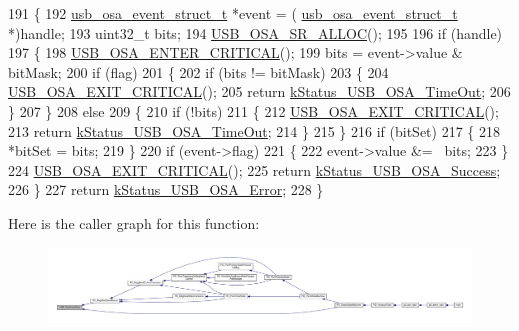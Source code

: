 \begin{DoxyCode}
191 \{
192     \hyperlink{struct__usb__osa__event__struct}{usb\_osa\_event\_struct\_t} *\textcolor{keyword}{event} = (
      \hyperlink{struct__usb__osa__event__struct}{usb\_osa\_event\_struct\_t} *)handle;
193     uint32\_t bits;
194     \hyperlink{usb__osa__bm_8h_a8dbccf46cc2f8e3b5cece6a4a84f7ae8}{USB\_OSA\_SR\_ALLOC}();
195 
196     \textcolor{keywordflow}{if} (handle)
197     \{
198         \hyperlink{usb__osa__bm_8h_a0485f70bf9c9a22f0340f014bc567362}{USB\_OSA\_ENTER\_CRITICAL}();
199         bits = \textcolor{keyword}{event}->value & bitMask;
200         \textcolor{keywordflow}{if} (flag)
201         \{
202             \textcolor{keywordflow}{if} (bits != bitMask)
203             \{
204                 \hyperlink{usb__osa__bm_8h_a5b8053eca19b6df666a26fad3b07f953}{USB\_OSA\_EXIT\_CRITICAL}();
205                 \textcolor{keywordflow}{return} \hyperlink{group__usb__os__abstraction_gga453ebd2f93aafb8c938c3a23c815f9bda9ff36cb34c565283214974d1097d08df}{kStatus\_USB\_OSA\_TimeOut};
206             \}
207         \}
208         \textcolor{keywordflow}{else}
209         \{
210             \textcolor{keywordflow}{if} (!bits)
211             \{
212                 \hyperlink{usb__osa__bm_8h_a5b8053eca19b6df666a26fad3b07f953}{USB\_OSA\_EXIT\_CRITICAL}();
213                 \textcolor{keywordflow}{return} \hyperlink{group__usb__os__abstraction_gga453ebd2f93aafb8c938c3a23c815f9bda9ff36cb34c565283214974d1097d08df}{kStatus\_USB\_OSA\_TimeOut};
214             \}
215         \}
216         \textcolor{keywordflow}{if} (bitSet)
217         \{
218             *bitSet = bits;
219         \}
220         \textcolor{keywordflow}{if} (event->flag)
221         \{
222             \textcolor{keyword}{event}->value &= ~bits;
223         \}
224         \hyperlink{usb__osa__bm_8h_a5b8053eca19b6df666a26fad3b07f953}{USB\_OSA\_EXIT\_CRITICAL}();
225         \textcolor{keywordflow}{return} \hyperlink{group__usb__os__abstraction_gga453ebd2f93aafb8c938c3a23c815f9bdab90805fb75297fda1ca60dbb2283f933}{kStatus\_USB\_OSA\_Success};
226     \}
227     \textcolor{keywordflow}{return} \hyperlink{group__usb__os__abstraction_gga453ebd2f93aafb8c938c3a23c815f9bda40b794ea06e27b8ec1d67538f12eb350}{kStatus\_USB\_OSA\_Error};
228 \}
\end{DoxyCode}


Here is the caller graph for this function\-:
\nopagebreak
\begin{figure}[H]
\begin{center}
\leavevmode
\includegraphics[width=350pt]{group__usb__os__abstraction_ga5ce587209d676871f3ec62900054febd_icgraph}
\end{center}
\end{figure}


